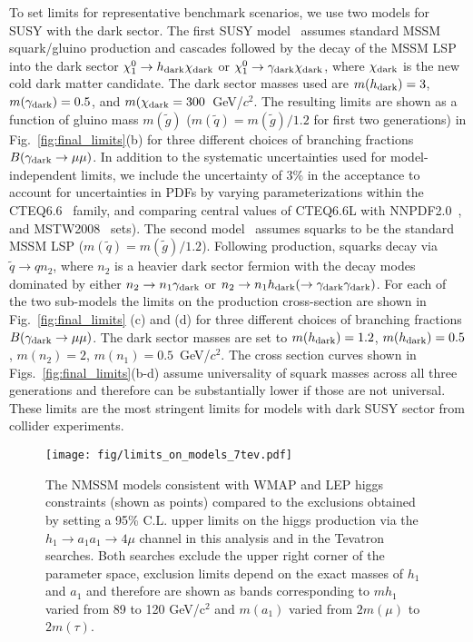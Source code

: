 To set limits for representative benchmark scenarios, we use two models for SUSY with the dark sector. The first SUSY model~\cite{BaiHan} assumes standard MSSM squark/gluino production and cascades followed by the decay of the MSSM LSP into the dark sector $\chi_1^0 \to h_{\mbox{\scriptsize dark}} \chi_{\mbox{\scriptsize dark}}$ or $\chi_1^0 \to \gamma_{\mbox{\scriptsize dark}} \chi_{\mbox{\scriptsize dark}}$, where $\chi_{\mbox{\scriptsize dark}}$ is the new cold dark matter candidate. The dark sector masses used are $m(h_{\mbox{\scriptsize dark}})=3$, $m(\gamma_{\mbox{\scriptsize dark}})=0.5$, and $m(\chi_{\mbox{\scriptsize dark}}=300$~GeV/$c^2$. The resulting limits are shown as a function of gluino mass $m(\tilde{g})$ ($m(\tilde{q})=m(\tilde{g})/1.2$ for first two generations) in Fig.~\ref{fig:final_limits}(b) for three different choices of branching fractions $B(\gamma_{\mbox{\scriptsize dark}} \to \mu \mu)$. In addition to the systematic uncertainties used for model-independent limits, we include the uncertainty of 3\% in the acceptance to account for uncertainties in PDFs by varying parameterizations within the CTEQ6.6~\cite{cteq6} family, and comparing central values of CTEQ6.6L with  NNPDF2.0~\cite{nnpdf}, and MSTW2008~\cite{mstw} sets).
The second model~\cite{Ruderman} assumes squarks to be the standard MSSM LSP ($m(\tilde{q})=m(\tilde{g})/1.2$). Following production, squarks decay via $\tilde{q} \to q n_2$, where $n_2$ is a heavier dark sector fermion with the decay modes dominated by either $n_2 \to n_1 \gamma_{\mbox{\scriptsize dark}}$ or $n_2 \to n_1 h_{\mbox{\scriptsize dark}}(\to \gamma_{\mbox{\scriptsize dark}}\gamma_{\mbox{\scriptsize dark}})$. For each of the two sub-models the limits on the production cross-section are shown in Fig.~\ref{fig:final_limits} (c) and (d) for three different choices of branching fractions $B(\gamma_{\mbox{\scriptsize dark}} \to \mu \mu)$. The dark sector masses are set to $m(h_{\mbox{\scriptsize dark}})=1.2$, $m(h_{\mbox{\scriptsize dark}})=0.5$, $m(n_2)=2$, $m(n_1)=0.5$~GeV/$c^2$. The cross section curves shown in Figs.~\ref{fig:final_limits}(b-d) assume universality of squark masses across all three generations and therefore can be substantially lower if those are not universal. These limits are the most stringent limits for models with dark SUSY sector from collider experiments.

\begin{figure}[tbh]
\centering
\texttt{[image: fig/limits\_on\_models\_7tev.pdf]}
\caption{The NMSSM models consistent with WMAP and LEP higgs constraints (shown as points) compared to the exclusions obtained by setting a 95\% C.L. upper limits on the higgs production via the $h_1 \to a_1 a_1 \to 4 \mu$ channel in this analysis and in the Tevatron searches. Both searches exclude the upper right corner of the parameter space, exclusion limits depend on the exact masses of $h_1$ and $a_1$ and therefore are shown as bands corresponding to $m{h_1}$ varied from 89 to 120 GeV/c$^2$ and $m(a_1)$ varied from $2m(\mu)$ to $2m(\tau)$. 
\label{fig:nmssm_limits}}
\end{figure}

